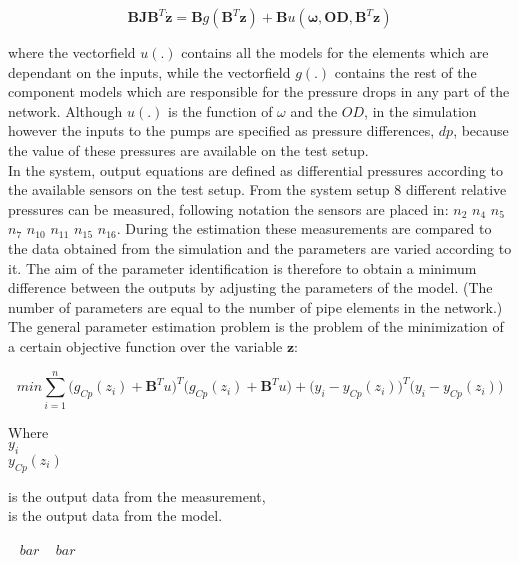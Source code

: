 \begin{equation}
 \pmb{B}\pmb{J {B}}^T \pmb{\dot{z}} = \pmb{B} g(\pmb{B}^T \pmb{z})+ \pmb{B} u(\pmb{\omega},\pmb{OD}, \pmb{B}^T \pmb{z})
 \label{InputOutputmodel}
\end{equation}

where the vectorfield $u(.)$ contains all the models for the elements which are dependant on the inputs, while the vectorfield $g(.)$ contains the rest of the component models which are responsible for the pressure drops in any part of the network. Although $u(.)$ is the function of $\omega$ and the $OD$, in the simulation however the inputs to the pumps are specified as pressure differences, $dp$, because the value of these pressures are available on the test setup. 
\\
In the system, output equations are defined as differential pressures according to the available sensors on the test setup. From the system setup $8$ different relative pressures can be measured, following  notation the sensors are placed in: 
$n_2$ $n_4$ $n_5$ $n_7$ $n_{10}$ $n_{11}$ $n_{15}$ $n_{16}$. During the estimation these measurements are compared to the data obtained from the simulation and the parameters are varied according to it. The aim of the parameter identification is therefore to obtain a minimum difference between the outputs by adjusting the parameters of the model. (The number of parameters are equal to the number of pipe elements in the network.) The general parameter estimation problem is the problem of the minimization of a certain objective function over the variable $\pmb{z}$: 

%
%

 \begin{equation}
 min \sum_{i=1}^{n}\Big(g_{Cp}(z_i) + \pmb{B}^Tu\Big)^T \Big(g_{Cp}(z_i)     + \pmb{B}^Tu\Big) + \big(y_i - y_{Cp}(z_i)\big)^T  \big(y_i - y_{Cp}(z_i)\big)
  \label{ObjectiveFunction}
 \end{equation}
 
\begin{minipage}[t]{0.20\textwidth}
Where\\
\hspace*{8mm} $y_i$ \\
\hspace*{8mm} $y_{Cp}(z_i)$ 
\end{minipage}
\begin{minipage}[t]{0.68\textwidth}
\vspace*{2mm}
is the output data from the measurement,\\
is the output data from the model.
\end{minipage}
\begin{minipage}[t]{0.10\textwidth}
\vspace*{2mm}
\textcolor{White}{te}$\unit{bar}$
\textcolor{White}{te}$\unit{bar}$
\end{minipage}


